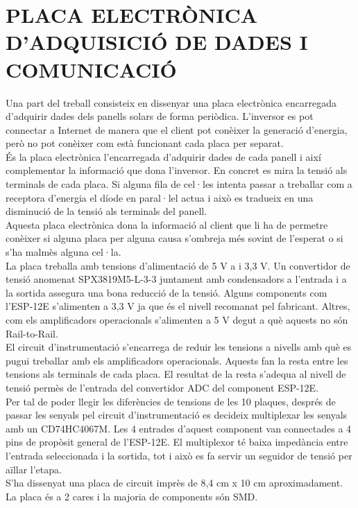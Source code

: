 \chapter{\uppercase{Placa electrònica d'adquisició de dades i comunicació}}

Una part del treball consisteix en dissenyar una placa electrònica encarregada d'adquirir dades dels panells solars de forma periòdica. L'inversor es pot connectar a Internet de manera que el client pot conèixer la generació d'energia, però no pot conèixer com està funcionant cada placa per separat.\\
\newline És la placa electrònica l'encarregada d'adquirir dades de cada panell i així complementar la informació que dona l'inversor. En concret es mira la tensió als terminals de cada placa. Si alguna fila de cel·les intenta passar a treballar com a receptora d'energia el díode en paral·lel actua i això es tradueix en una disminució de la tensió als terminals del panell.\\
\newline Aquesta placa electrònica dona la informació al client que li ha de permetre conèixer si alguna placa per alguna causa s'ombreja més sovint de l'esperat o si s'ha malmès alguna cel·la.\\
\newline La placa treballa amb tensions d'alimentació de 5 V a i 3,3 V. Un convertidor de tensió anomenat SPX3819M5-L-3-3 juntament amb condensadors a l'entrada i a la sortida assegura una bona reducció de la tensió. Alguns components com l'ESP-12E s'alimenten a 3,3 V ja que és el nivell recomanat pel fabricant. Altres, com els amplificadors operacionals s'alimenten a 5 V degut a què aquests no són Rail-to-Rail.\\
\newline El circuit d'instrumentació s'encarrega de reduir les tensions a nivells amb què es pugui treballar amb els amplificadors operacionals. Aquests fan la resta entre les tensions als terminals de cada placa. El resultat de la resta s'adequa al nivell de tensió permès de l'entrada del convertidor ADC del component ESP-12E.\\
\newline Per tal de poder llegir les diferències de tensions de les 10 plaques, després de passar les senyals pel circuit d'instrumentació es decideix multiplexar les senyals amb un CD74HC4067M. Les 4 entrades d'aquest component van connectades a 4 pins de propòsit general de l'ESP-12E. El multiplexor té baixa impedància entre l'entrada seleccionada i la sortida, tot i això es fa servir un seguidor de tensió per aïllar l'etapa.\\
\newline S'ha dissenyat una placa de circuit imprès de 8,4 cm x 10 cm aproximadament. La placa és a 2 cares i la majoria de components són SMD.



\clearpage


